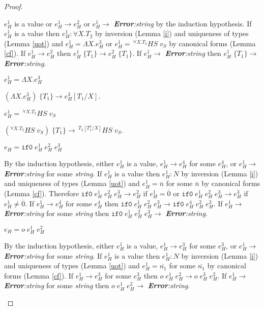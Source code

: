 \begin{theorem}
\begin{proof}
\begin{case}
$e_{H}^{1}$ is a value or $e_{H}^{1}\rightarrow e_{H}^{2}$ or $e_{H}^{1}\rightarrow$ \emph{\textbf{Error}:\;string} by the induction hypothesis.  If $e_{H}^{1}$ is a value then $e_{H}^{1}:\forall X.T_{2}$ by inversion (Lemma \ref{i}) and uniqueness of types (Lemma \ref{uot}) and $e_{H}^{1}=\Lambda X.e_{H}^{3}$ or $e_{H}^{1}=\,^{\forall X.T_{2}}HS\;v_{S}$ by canonical forms (Lemma \ref{cf}).  If $e_{H}^{1}\rightarrow e_{H}^{2}$ then $e_{H}^{1}\;\lbrace T_{1}\rbrace\rightarrow e_{H}^{2}\;\lbrace T_{1}\rbrace$.  If $e_{H}^{1}\rightarrow$ \emph{\textbf{Error}:\;string} then $e_{H}^{1}\;\lbrace T_{1}\rbrace\rightarrow$ \emph{\textbf{Error}:\;string}.
\end{case}
\begin{subcase}
$e_{H}^{1}=\Lambda X.e_{H}^{3}$

$(\Lambda X.e_{H}^{3})\;\lbrace T_{1}\rbrace\rightarrow e_{H}^{3}[T_{1}/X]$.
\end{subcase}
\begin{subcase}
$e_{H}^{1}=\,^{\forall X.T_{2}}HS\;v_{S}$

$(^{\forall X.T_{2}}HS\;v_{S})\;\lbrace T_{1}\rbrace\rightarrow\,^{T_{2}[T_{1}^{a}/X]}HS\;v_{S}$.
\end{subcase}
\begin{case}
$e_{H}=\mathtt{if0}\;e_{H}^{1}\;e_{H}^{2}\;e_{H}^{3}$

By the induction hypothesis, either $e_{H}^{1}$ is a value, $e_{H}^{1}\rightarrow e_{H}^{4}$ for some $e_{H}^{4}$, or $e_{H}^{1}\rightarrow$ \emph{\textbf{Error}:\;string} for some \emph{string}.  If $e_{H}^{1}$ is a value then $e_{H}^{1}:N$ by inversion (Lemma \ref{i}) and uniqueness of types (Lemma \ref{uot}) and $e_{H}^{1}=\overline{n}$ for some $\overline{n}$ by canonical forms (Lemma \ref{cf}).  Therefore $\mathtt{if0}\;e_{H}^{1}\;e_{H}^{2}\;e_{H}^{3}\rightarrow e_{H}^{2}$ if $e_{H}^{1}=\overline{0}$ or $\mathtt{if0}\;e_{H}^{1}\;e_{H}^{2}\;e_{H}^{3}\rightarrow e_{H}^{3}$ if $e_{H}^{1}\neq\overline{0}$.  If $e_{H}^{1}\rightarrow e_{H}^{4}$ for some $e_{H}^{4}$ then $\mathtt{if0}\;e_{H}^{1}\;e_{H}^{2}\;e_{H}^{3}\rightarrow \mathtt{if0}\;e_{H}^{4}\;e_{H}^{2}\;e_{H}^{3}$.  If $e_{H}^{1}\rightarrow$ \emph{\textbf{Error}:\;string} for some \emph{string} then $\mathtt{if0}\;e_{H}^{1}\;e_{H}^{2}\;e_{H}^{3}\rightarrow$ \emph{\textbf{Error}:\;string}.
\end{case}
\begin{case}
$e_{H}=o\;e_{H}^{1}\;e_{H}^{2}$

By the induction hypothesis, either $e_{H}^{1}$ is a value, $e_{H}^{1}\rightarrow e_{H}^{3}$ for some $e_{H}^{3}$, or $e_{H}^{1}\rightarrow$ \emph{\textbf{Error}:\;string} for some \emph{string}.  If $e_{H}^{1}$ is a value then $e_{H}^{1}:N$ by inversion (Lemma \ref{i}) and uniqueness of types (Lemma \ref{uot}) and $e_{H}^{1}=\overline{n_{1}}$ for some $\overline{n_{1}}$ by canonical forms (Lemma \ref{cf}).  If $e_{H}^{1}\rightarrow e_{H}^{3}$ for some $e_{H}^{3}$ then $o\;e_{H}^{1}\;e_{H}^{2}\rightarrow o\;e_{H}^{3}\;e_{H}^{2}$.  If $e_{H}^{1}\rightarrow$ \emph{\textbf{Error}:\;string} for some \emph{string} then $o\;e_{H}^{1}\;e_{H}^{2}\rightarrow$ \emph{\textbf{Error}:\;string}.


\end{case}
\end{proof}
\end{theorem}
